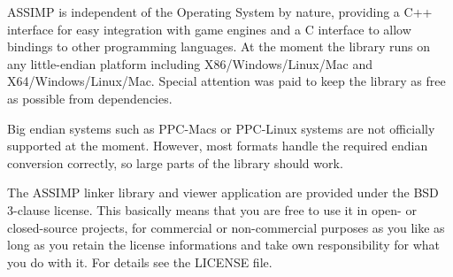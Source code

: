 A\+S\+S\+I\+M\+P is independent of the Operating System by nature, providing a C++ interface for easy integration with game engines and a C interface to allow bindings to other programming languages. At the moment the library runs on any little-\/endian platform including X86/\+Windows/\+Linux/\+Mac and X64/\+Windows/\+Linux/\+Mac. Special attention was paid to keep the library as free as possible from dependencies.

Big endian systems such as P\+P\+C-\/\+Macs or P\+P\+C-\/\+Linux systems are not officially supported at the moment. However, most formats handle the required endian conversion correctly, so large parts of the library should work.

The A\+S\+S\+I\+M\+P linker library and viewer application are provided under the B\+S\+D 3-\/clause license. This basically means that you are free to use it in open-\/ or closed-\/source projects, for commercial or non-\/commercial purposes as you like as long as you retain the license informations and take own responsibility for what you do with it. For details see the L\+I\+C\+E\+N\+S\+E file.

